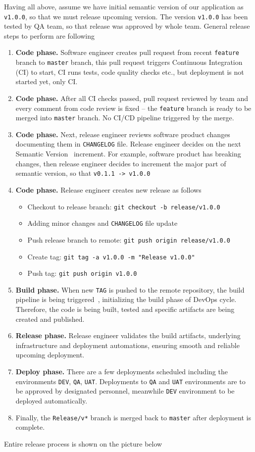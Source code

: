 ﻿Having all above, assume we have initial semantic version of our application as \texttt{v1.0.0},
so that we must release upcoming version.
The version \texttt{v1.0.0} has been tested by QA team, so that release was approved by whole team.
General release steps to perform are following
\begin{enumerate}
    \item \textbf{Code phase.}
    Software engineer creates pull request from recent \texttt{feature} branch to \texttt{master} branch,
    this pull request triggers Continuous Integration (CI) to start, CI runs tests, code quality checks etc.,
    but deployment is not started yet, only CI\@.
    \item \textbf{Code phase.}
    After all CI checks passed, pull request reviewed by team and every comment from code review is fixed --
    the \texttt{feature} branch is ready to be merged into \texttt{master} branch.
    No CI/CD pipeline triggered by the merge.
    \item \textbf{Code phase.}
    Next, release engineer reviews software product changes documenting them in \texttt{CHANGELOG} file.
    Release engineer decides on the next Semantic Version~\cite{SemanticVersioning} increment.
    For example, software product has breaking changes,
    then release engineer decides to increment the major part of semantic version, so that \texttt{v0.1.1 -> v1.0.0}
    \item \textbf{Code phase.}
    Release engineer creates new release as follows
    \begin{itemize}
        \item Checkout to release branch: \texttt{git checkout -b release/v1.0.0}
        \item Adding minor changes and \texttt{CHANGELOG} file update
        \item Push release branch to remote: \texttt{git push origin release/v1.0.0}
        \item Create tag: \texttt{git tag -a v1.0.0 -m "Release v1.0.0"}
        \item Push tag: \texttt{git push origin v1.0.0}
    \end{itemize}
    \item \textbf{Build phase.}
    When new \texttt{TAG} is pushed to the remote repository, the build pipeline is being triggered~\cite{AzurePipelinesTriggers},
    initializing the build phase of DevOps cycle.
    Therefore, the code is being built, tested and specific artifacts are being created and published.
    \item \textbf{Release phase.} Release engineer validates the build artifacts,
    underlying infrastructure and deployment automations, ensuring smooth and reliable upcoming deployment.
    \item \textbf{Deploy phase.}
    There are a few deployments scheduled including the environments \texttt{DEV}, \texttt{QA}, \texttt{UAT}.
    Deployments to \texttt{QA} and \texttt{UAT} environments are to be approved by designated personnel,
    meanwhile \texttt{DEV} environment to be deployed automatically.
    \item Finally, the \texttt{Release/v*} branch is merged back to \texttt{master} after deployment is complete.
\end{enumerate}
Entire release process is shown on the picture below

